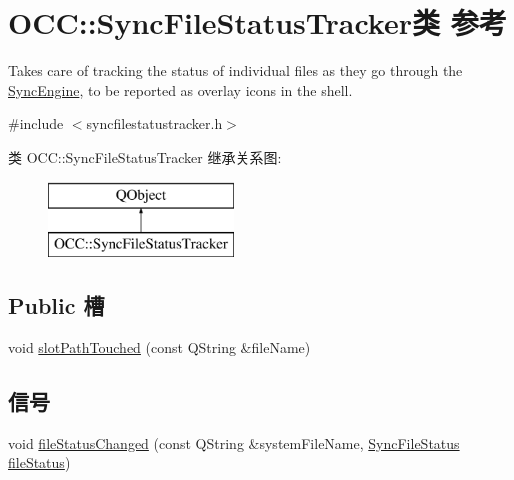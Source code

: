 \hypertarget{class_o_c_c_1_1_sync_file_status_tracker}{}\section{O\+CC\+:\+:Sync\+File\+Status\+Tracker类 参考}
\label{class_o_c_c_1_1_sync_file_status_tracker}


Takes care of tracking the status of individual files as they go through the \hyperlink{class_o_c_c_1_1_sync_engine}{Sync\+Engine}, to be reported as overlay icons in the shell.  




{\ttfamily \#include $<$syncfilestatustracker.\+h$>$}

类 O\+CC\+:\+:Sync\+File\+Status\+Tracker 继承关系图\+:\begin{figure}[H]
\begin{center}
\leavevmode
\includegraphics[height=2.000000cm]{class_o_c_c_1_1_sync_file_status_tracker}
\end{center}
\end{figure}
\subsection*{Public 槽}
\begin{DoxyCompactItemize}
\item 
void \hyperlink{class_o_c_c_1_1_sync_file_status_tracker_a4df2b8af03afa1d50e78a297f3e66be6}{slot\+Path\+Touched} (const Q\+String \&file\+Name)
\end{DoxyCompactItemize}
\subsection*{信号}
\begin{DoxyCompactItemize}
\item 
void \hyperlink{class_o_c_c_1_1_sync_file_status_tracker_a7ef7a0b3f3771ef113f10fbd42f22726}{file\+Status\+Changed} (const Q\+String \&system\+File\+Name, \hyperlink{class_o_c_c_1_1_sync_file_status}{Sync\+File\+Status} \hyperlink{class_o_c_c_1_1_sync_file_status_tracker_a89d86ea92cbc17fefcdfe68cfd4f5f5c}{file\+Status})
\end{DoxyCompactItemize}
